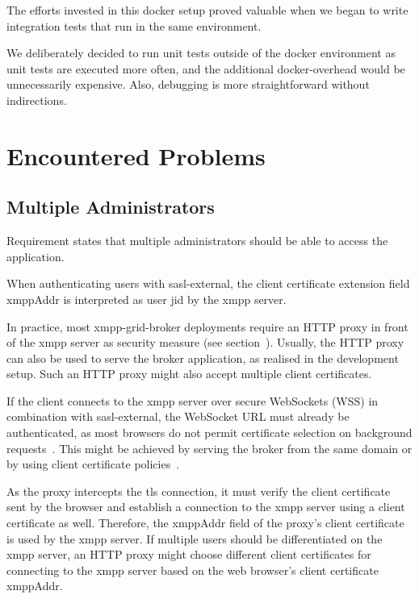 The efforts invested in this docker setup proved valuable when we began to write integration tests that run in the same environment.

We deliberately decided to run unit tests outside of the docker environment as unit tests are executed more often, and the additional docker-overhead would be unnecessarily expensive.
Also, debugging is more straightforward without indirections.

\section{Encountered Problems}\label{encountered-problems}

\subsection{Multiple Administrators}\label{sec:limitations-of-requirement-multiple-administrators}

Requirement  states that multiple administrators should be able to access the application.

When authenticating users with \gls{sasl-external}, the client certificate extension field xmppAddr is interpreted as user \gls{jid} by the \gls{xmpp} server.

In practice, most \gls{xmpp-grid-broker} deployments require an HTTP proxy in front of the \gls{xmpp} server as security measure (see section~).
Usually, the HTTP proxy can also be used to serve the \gls{broker} application, as realised in the development setup.
Such an HTTP proxy might also accept multiple client certificates.

If the client connects to the \gls{xmpp} server over secure WebSockets (WSS) in combination with \gls{sasl-external}, the WebSocket URL must already be authenticated, as most browsers do not permit certificate selection on background requests~\cite{chromium-issue-background-certs}.
This might be achieved by serving the \gls{broker} from the same domain or by using client certificate policies~\cite{chrome-cert-policies}.

As the proxy intercepts the \gls{tls} connection, it must verify the client certificate sent by the browser and establish a connection to the \gls{xmpp} server using a client certificate as well.
Therefore, the xmppAddr field of the proxy's client certificate is used by the \gls{xmpp} server.
If multiple users should be differentiated on the \gls{xmpp} server, an HTTP proxy might choose different client certificates for connecting to the \gls{xmpp} server based on the web browser's client certificate xmppAddr.


